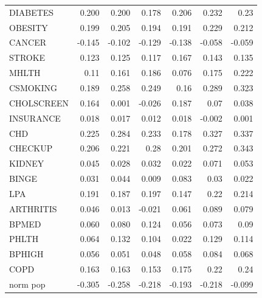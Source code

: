 \documentclass[12pt]{article}
\theoremstyle{definition}
\renewcommand{\_}{%
    \textunderscore\hspace{0pt}%
}
\begin{document}
\begin{table}[!h]
{\begin{tabular}{lrrrrrr}
DIABETES                & 0.200         & 0.200         & 0.178       & 0.206       & 0.232       & 0.23      \\
OBESITY                 & 0.199       & 0.205       & 0.194       & 0.191       & 0.229       & 0.212     \\
CANCER                  & -0.145      & -0.102      & -0.129      & -0.138      & -0.058      & -0.059    \\
STROKE                  & 0.123       & 0.125       & 0.117       & 0.167       & 0.143       & 0.135     \\
MHLTH                   & 0.11        & 0.161       & 0.186       & 0.076       & 0.175       & 0.222     \\
CSMOKING                & 0.189       & 0.258       & 0.249       & 0.16        & 0.289       & 0.323     \\
CHOLSCREEN              & 0.164       & 0.001       & -0.026      & 0.187       & 0.07        & 0.038     \\
INSURANCE               & 0.018       & 0.017       & 0.012       & 0.018       & -0.002      & 0.001     \\
CHD                     & 0.225       & 0.284       & 0.233       & 0.178       & 0.327       & 0.337     \\
CHECKUP                 & 0.206       & 0.221       & 0.28        & 0.201       & 0.272       & 0.343     \\
KIDNEY                  & 0.045       & 0.028       & 0.032       & 0.022       & 0.071       & 0.053     \\
BINGE                   & 0.031       & 0.044       & 0.009       & 0.083       & 0.03        & 0.022     \\
LPA                     & 0.191       & 0.187       & 0.197       & 0.147       & 0.22        & 0.214     \\
ARTHRITIS               & 0.046       & 0.013       & -0.021      & 0.061       & 0.089       & 0.079     \\
BPMED                   & 0.060        & 0.080        & 0.124       & 0.056       & 0.073       & 0.09      \\
PHLTH                   & 0.064       & 0.132       & 0.104       & 0.022       & 0.129       & 0.114     \\
BPHIGH                  & 0.056       & 0.051       & 0.048       & 0.058       & 0.084       & 0.068     \\
COPD                    & 0.163       & 0.163       & 0.153       & 0.175       & 0.22        & 0.24      \\
norm\_pop                & -0.305      & -0.258      & -0.218      & -0.193      & -0.218      & -0.099  \\
\bottomrule
\end{tabular}
}
\end{table}
\end{document}

